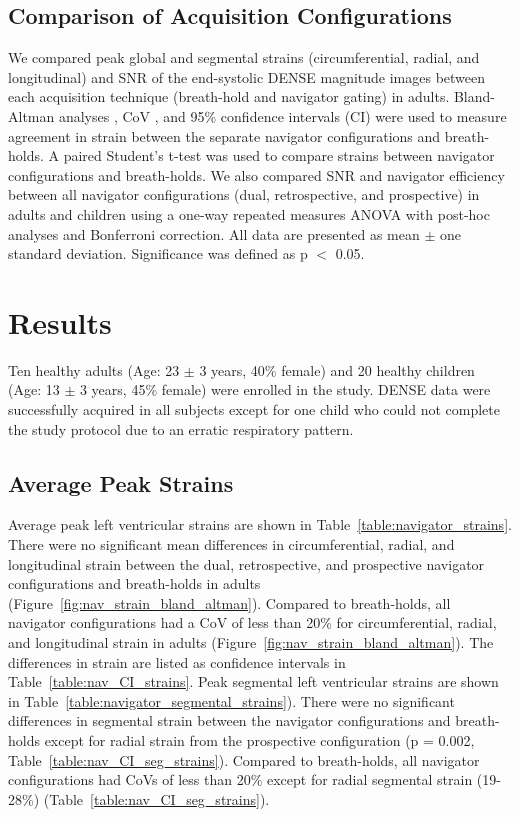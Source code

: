 \subsection{Comparison of Acquisition Configurations}
	We compared peak global and segmental strains (circumferential, radial, and longitudinal) and SNR of the end-systolic DENSE magnitude images between each acquisition technique (breath-hold and navigator gating) in adults. Bland-Altman analyses \cite{Bland1986}, CoV \cite{Haggerty2013}, and 95\% confidence intervals (CI) were used to measure agreement in strain between the separate navigator configurations and breath-holds. A paired Student's t-test was used to compare strains between navigator configurations and breath-holds. We also compared SNR and navigator efficiency between all navigator configurations (dual, retrospective, and prospective) in adults and children using a one-way repeated measures ANOVA with post-hoc analyses and Bonferroni correction. All data are presented as mean $\pm$ one standard deviation. Significance was defined as p $<$ 0.05.

\section{Results}
	Ten healthy adults (Age: 23 $\pm$ 3 years, 40\% female) and 20 healthy children (Age: 13 $\pm$ 3 years, 45\% female) were enrolled in the study. DENSE data were successfully acquired in all subjects except for one child who could not complete the study protocol due to an erratic respiratory pattern.

\subsection{Average Peak Strains}
	Average peak left ventricular strains are shown in Table~\ref{table:navigator_strains}. There were no significant mean differences in circumferential, radial, and longitudinal strain between the dual, retrospective, and prospective navigator configurations and breath-holds in adults (Figure~\ref{fig:nav_strain_bland_altman}). Compared to breath-holds, all navigator configurations had a CoV of less than 20\% for circumferential, radial, and longitudinal strain in adults (Figure~\ref{fig:nav_strain_bland_altman}). The differences in strain are listed as confidence intervals in Table~\ref{table:nav_CI_strains}. Peak segmental left ventricular strains are shown in Table~\ref{table:navigator_segmental_strains}). There were no significant differences in segmental strain between the navigator configurations and breath-holds except for radial strain from the prospective configuration (p = 0.002, Table~\ref{table:nav_CI_seg_strains}). Compared to breath-holds, all navigator configurations had CoVs of less than 20\% except for radial segmental strain (19-28\%) (Table~\ref{table:nav_CI_seg_strains}).

